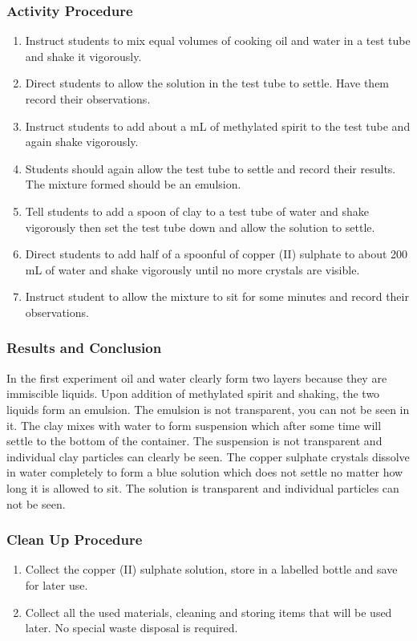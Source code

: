 \subsubsection*{Activity Procedure}
\begin{enumerate}
\item{Instruct students to mix equal volumes of cooking oil and water in a test tube and shake it vigorously.}
\item{Direct students to allow the solution in the test tube to settle. Have them record their observations.}
\item{Instruct students to add about a mL of methylated spirit to the test tube and again shake vigorously.}
\item{Students should again allow the test tube to settle and record their results. The mixture formed should be an emulsion.}
\item{Tell students to add a spoon of clay to a test tube of water and shake vigorously then set the test tube down and allow the solution to settle.}
\item{Direct students to add half of a spoonful of copper (II) sulphate to about 200 mL of water and shake vigorously until no more crystals are visible.}
\item{Instruct student to allow the mixture to sit for some minutes and record their observations.}
\end{enumerate}

\subsubsection*{Results and Conclusion}
In the first experiment oil and water clearly form two layers because they are immiscible liquids. Upon addition of methylated spirit and shaking, the two liquids form an emulsion. The emulsion is not transparent, you can not be seen in it.
The clay mixes with water to form suspension which after some time will settle to the bottom of the container. The suspension is not transparent and individual clay particles can clearly be seen.
The copper sulphate crystals dissolve in water completely to form a blue solution which does not settle no matter how long it is allowed to sit. The solution is transparent and individual particles can not be seen.

\subsubsection*{Clean Up Procedure}
\begin{enumerate}
\item{Collect the copper (II) sulphate solution, store in a labelled bottle and save for later use.}
\item{Collect all the used materials, cleaning and storing items that will be used later. No special waste disposal is required.}
\end{enumerate}

